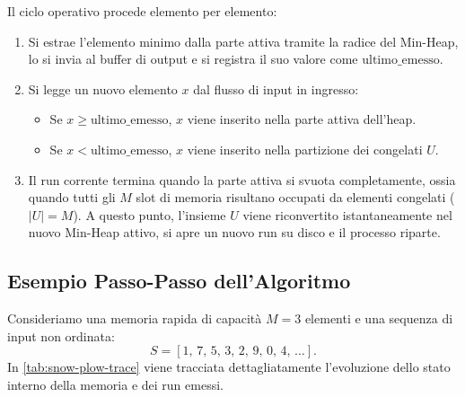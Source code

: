 Il ciclo operativo procede elemento per elemento:
\begin{enumerate}
  \item Si estrae l'elemento minimo dalla parte attiva tramite la radice del Min-Heap, lo si invia al buffer di output e si registra il suo valore come $\text{ultimo\_emesso}$.
  \item Si legge un nuovo elemento $x$ dal flusso di input in ingresso:
  \begin{itemize}
    \item Se $x \ge \text{ultimo\_emesso}$, $x$ viene inserito nella parte attiva dell'heap.
    \item Se $x < \text{ultimo\_emesso}$, $x$ viene inserito nella partizione dei congelati $U$.
  \end{itemize}
  \item Il run corrente termina quando la parte attiva si svuota completamente, ossia quando tutti gli $M$ slot di memoria risultano occupati da elementi congelati ($\vert{}U\vert{} = M$). A questo punto, l'insieme $U$ viene riconvertito istantaneamente nel nuovo Min-Heap attivo, si apre un nuovo run su disco e il processo riparte.
\end{enumerate}

\subsection{Esempio Passo-Passo dell'Algoritmo}
\label{subsec:snow-plow-trace}

Consideriamo una memoria rapida di capacità $M = 3$ elementi e una sequenza di input non ordinata:
\[
  S = [1, \, 7, \, 5, \, 3, \, 2, \, 9, \, 0, \, 4, \, \dots].
\]
In \autoref{tab:snow-plow-trace} viene tracciata dettagliatamente l'evoluzione dello stato interno della memoria e dei run emessi.

